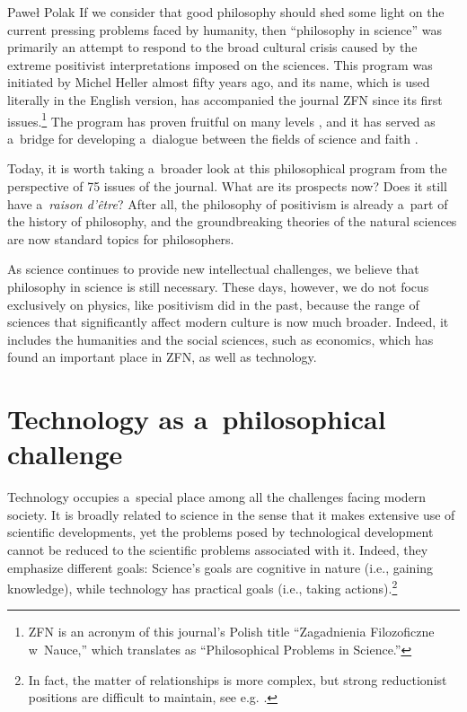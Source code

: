 \begin{artengenv}{Paweł Polak}
If we consider that good philosophy should shed some light on the current pressing problems faced by humanity, then ``philosophy in science'' was primarily an attempt to respond to the broad cultural crisis caused by the extreme positivist interpretations imposed on the sciences. This program was initiated by Michel Heller almost fifty years ago, and its name, which is used literally in the English version, has accompanied the journal ZFN since its first issues.\footnote{ZFN is an acronym of this journal's Polish title ``Zagadnienia Filozoficzne w~Nauce,'' which translates as ``Philosophical Problems in Science.''} The program has proven fruitful on many levels 
\parencites[e.g][]{brozek_philosophy_2011}[][]{polak_oblicza_2017}, %
 and it has served as a~bridge for developing a~dialogue between the fields of science and faith 
\parencite[][]{polak_theory_2023}.%




Today, it is worth taking a~broader look at this philosophical program from the perspective of 75 issues of the journal. What are its prospects now? Does it still have a~\textit{raison d'être}? After all, the philosophy of positivism is already a~part of the history of philosophy, and the groundbreaking theories of the natural sciences are now standard topics for philosophers.



As science continues to provide new intellectual challenges, we believe that philosophy in science is still necessary. These days, however, we do not focus exclusively on physics, like positivism did in the past, because the range of sciences that significantly affect modern culture is now much broader. Indeed, it includes the humanities and the social sciences, such as economics, which has found an important place in ZFN, as well as technology.



\section{Technology as a~philosophical challenge}

Technology occupies a~special place among all the challenges facing modern society. It is broadly related to science in the sense that it makes extensive use of scientific developments, yet the problems posed by technological development cannot be reduced to the scientific problems associated with it. Indeed, they emphasize different goals: Science's goals are cognitive in nature (i.e., gaining knowledge), while technology has practical goals (i.e., taking actions).\footnote{In fact, the matter of relationships is more complex, but strong reductionist positions are difficult to maintain, see e.g. 
\parencite[][sec.2.1.-2.2.]{franssen_philosophy_2023}.%
}




\end{artengenv}
